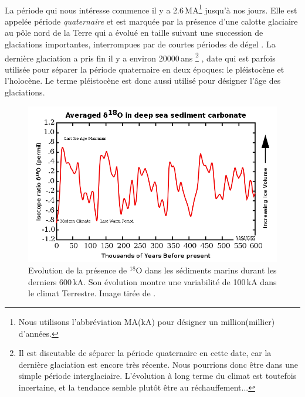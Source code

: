 
\paragraph{} La période qui nous intéresse commence il y a 2.6\,MA\footnote{Nous utilisons l'abbréviation MA(kA) pour désigner un million(millier) d'années.} jusqu'à nos jours. Elle est appelée période \emph{quaternaire} et est marquée par la présence d'une calotte glaciaire au pôle nord de la Terre qui a évolué en taille suivant une succession de glaciations importantes, interrompues par de courtes périodes de dégel \cite{wiki_quaternary} \cite{wiki_quaternary_glaciation}. La dernière glaciation a pris fin il y a environ 20000\,ans
\footnote{Il est discutable de séparer la période quaternaire en cette date, car la dernière glaciation est encore très récente. Nous pourrions donc être dans une simple période interglaciaire. L'évolution à long terme du climat est toutefois incertaine, et la tendance semble plutôt être au réchauffement...}
, date qui est parfois utilisée pour séparer la période quaternaire en deux époques: le pléistocène et l'holocène. Le terme pléistocène est donc aussi utilisé pour désigner l'âge des glaciations.



\begin{figure}
	\centering
	\includegraphics[width=0.9\linewidth]{figures/evol18Osur600kA}
	\caption{Evolution de la présence de $^{18}$O dans les sédiments marins durant les derniers 600\,kA. %
		Son évolution montre une variabilité de 100\,kA dans le climat Terrestre. Image tirée de \cite{giss}.}
	\label{fig:evol18Osur600kA}
\end{figure}

